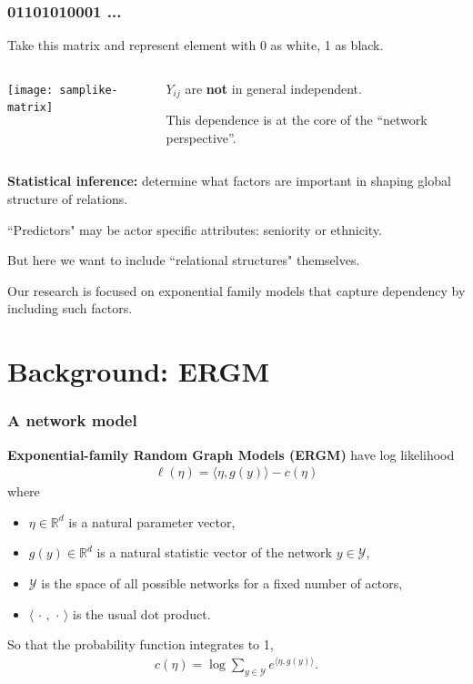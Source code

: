 \documentclass[ 10pt]{beamer}
\def\RR{{\mathbb R}}
\def\YY{{\mathcal Y}}
\newcommand{\fatdot}{\,\cdot\,}
\newcommand{\inner}[1]{\langle #1 \rangle}
\begin{document}
{
\frametitle{01101010001 ...}
Take this matrix and represent element with 0 as white, 1 as black.
\pause
\begin{columns}[T]
\begin{column}[T]{0.4\textwidth}
\texttt{[image: samplike-matrix]}
\end{column}
\pause
\begin{column}[T]{0.6\textwidth}
\vspace{5mm}

$Y_{ij}$ are \textbf{not} in general independent.
\vspace{2mm}

This dependence is at the core of the ``network perspective''.
\end{column}
\end{columns}
\vspace{2mm}

\pause
\textbf{Statistical inference:} determine what factors are important in shaping 
global structure of relations.  
\vspace{2mm}

``Predictors" may be actor specific attributes: seniority or ethnicity.

But here we want to include ``relational structures" themselves.
\vspace{2mm}

Our research is focused on exponential family models that capture dependency by including such factors.
}
\section{Background: ERGM}
\frame
{
\frametitle{A network model}


\textbf{Exponential-family Random Graph Models (ERGM)} have log likelihood
\begin{align*}%
	\ell( \eta) = \inner{\eta, g(y)} - c(\eta)
\end{align*}
where 
\begin{itemize}
\item $\eta \in \RR^d$ is a natural parameter vector,
\item $g(y)\in\RR^d$ is a natural statistic vector of the network $y\in \YY$,
\item $\YY$ is the space of all possible networks for a fixed number of actors,
\item $\inner{\fatdot,\fatdot}$ is the usual dot product.
\end{itemize}
\vspace{2mm}

So that the probability function integrates to 1,
\begin{align*}
	c(\eta) = \log \sum_{y \in \YY} e^{\inner{\eta, g(y)}}.
\end{align*}
}
\end{document}
